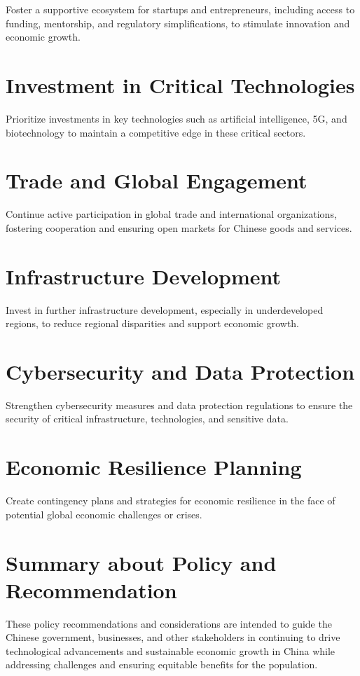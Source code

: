 Foster a supportive ecosystem for startups and entrepreneurs, 
including access to funding, mentorship, and regulatory 
simplifications, to stimulate innovation and economic growth.

\section{Investment in Critical Technologies}

Prioritize investments in key technologies such as artificial 
intelligence, 5G, and biotechnology to maintain a competitive 
edge in these critical sectors.

\section{Trade and Global Engagement}

Continue active participation in global trade and international 
organizations, fostering cooperation and ensuring open markets 
for Chinese goods and services.

\section{Infrastructure Development}

Invest in further infrastructure development, especially in 
underdeveloped regions, to reduce regional disparities and 
support economic growth.

\section{Cybersecurity and Data Protection}

Strengthen cybersecurity measures and data protection regulations 
to ensure the security of critical infrastructure, technologies, 
and sensitive data.

\section{Economic Resilience Planning}

Create contingency plans and strategies for economic resilience 
in the face of potential global economic challenges or crises.

\section{Summary about Policy and Recommendation}

These policy recommendations and considerations are intended to 
guide the Chinese government, businesses, and other stakeholders 
in continuing to drive technological advancements and sustainable 
economic growth in China while addressing challenges and ensuring 
equitable benefits for the population.